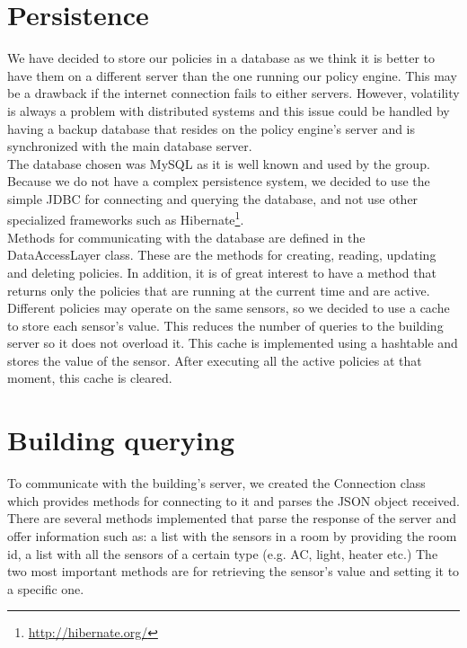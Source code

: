\section{Persistence}
We have decided to store our policies in a database as we think it is better to have them on a different server than the one running our policy engine. This may be a drawback if the internet connection fails to either servers. However, volatility is always a problem with distributed systems and this issue could be handled by having a backup database that resides on the policy engine's server and is synchronized with the main database server.
\\The database chosen was MySQL as it is well known and used by the group. Because we do not have a complex persistence system, we decided to use the simple JDBC for connecting and querying the database, and not use other specialized frameworks such as Hibernate\footnote{\url{http://hibernate.org/}}. 
\\Methods for communicating with the database are defined in the DataAccessLayer class. These are the methods for creating, reading, updating and deleting policies. In addition, it is of great interest to have a method that returns only the policies that are running at the current time and are active. 
\\Different policies may operate on the same sensors, so we decided to use a cache to store each sensor's value. This reduces the number of queries to the building server so it does not overload it. This cache is implemented using a hashtable and stores the value of the sensor. After executing all the active policies at that moment, this cache is cleared. 

\section{Building querying}
To communicate with the building's server, we created the Connection class which provides methods for connecting to it and parses the JSON object received. There are several methods implemented that parse the response of the server and offer information such as: a list with the sensors in a room by providing the room id, a list with all the sensors of a certain type (e.g. AC, light, heater etc.) The two most important methods are for retrieving the sensor's value and setting it to a specific one. 

